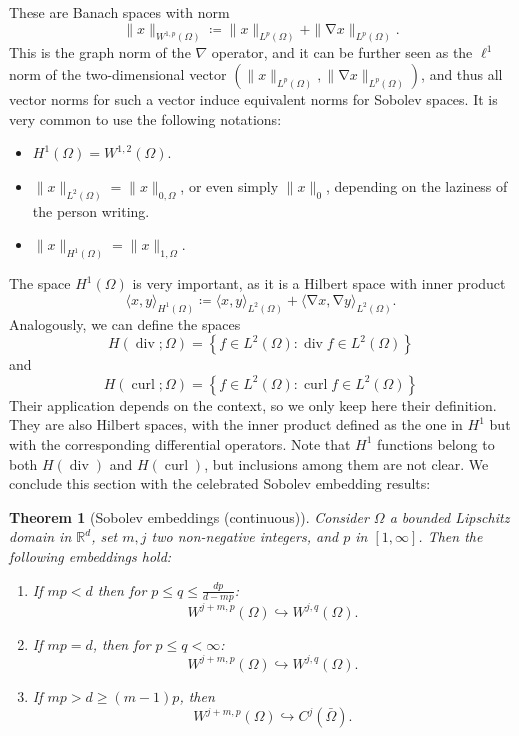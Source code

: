 \documentclass{article}
\DeclareMathOperator{\grad}{\nabla}
\DeclareMathOperator{\dive}{\text{div}}
\DeclareMathOperator{\curl}{\text{curl}}
\newcommand{\R}{\mathbb{R}}
\newtheorem{theorem}{Theorem}
\begin{document}
These are Banach spaces with norm
    $$ \| x \|_{W^{1,p}(\Omega)} \coloneqq \| x \|_{L^p(\Omega)} + \| \grad x \|_{L^p(\Omega)}. $$
This is the graph norm of the $\nabla$ operator, and it can be further seen as the $\ell^1$ norm of the two-dimensional vector $(\|x\|_{L^p(\Omega)}, \|\grad x\|_{L^p(\Omega)})$, and thus all vector norms for such a vector induce equivalent norms for Sobolev spaces. It is very common to use the following notations:   
    \begin{itemize}
        \item $H^1(\Omega) = W^{1,2}(\Omega)$.
        \item $\| x \|_{L^2(\Omega)} = \| x \|_{0,\Omega}$, or even simply $ \| x\|_0$, depending on the laziness of the person writing. 
        \item $\| x \|_{H^1(\Omega)} = \|x\|_{1,\Omega}$.
    \end{itemize}
The space $H^1(\Omega)$ is very important, as it is a Hilbert space with inner product
    $$ \langle x,y\rangle_{H^1(\Omega)} \coloneqq \langle x,y\rangle_{L^2(\Omega)} + \langle \grad x, \grad y\rangle_{L^2(\Omega)}. $$
Analogously, we can define the spaces
    $$ H(\dive; \Omega) = \left\{f\in L^2(\Omega): \dive f \in L^2(\Omega)\right\} $$
and    
    $$ H(\curl; \Omega) = \left\{f\in L^2(\Omega): \curl f \in L^2(\Omega)\right\}$$
Their application depends on the context, so we only keep here their definition. They are also Hilbert spaces, with the inner product defined as the one in $H^1$ but with the corresponding differential operators. Note that $H^1$ functions belong to both $H(\dive)$ and $H(\curl)$, but inclusions among them are not clear. We conclude this section with the celebrated Sobolev embedding results: 

\begin{theorem}[Sobolev embeddings (continuous)]
    Consider $\Omega$ a bounded Lipschitz domain in $\R^d$, set $m,j$ two non-negative integers, and $p$ in $[1,\infty]$. Then the following embeddings hold: 
    \begin{enumerate}
        \item If $mp < d$ then for $p \leq q \leq \frac{dp}{d-mp}$:
            $$ W^{j+m, p}(\Omega) \hookrightarrow W^{j,q}(\Omega). $$
        \item If $mp = d$, then for $p \leq q < \infty$:
            $$ W^{j+m, p}(\Omega) \hookrightarrow W^{j,q}(\Omega). $$
        \item If $mp > d \geq (m-1)p$, then 
            $$ W^{j+m,p}(\Omega) \hookrightarrow C^j(\bar\Omega). $$
    \end{enumerate}
\end{theorem}
\end{document}
